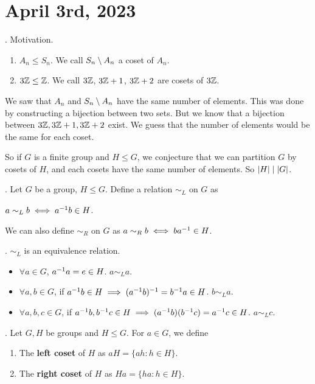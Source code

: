 \section*{April 3rd, 2023}


\ex. Motivation.
\begin{enumerate}
    \item \(A_n \leq S_n\). We call \(S_n \setminus A_n\) a coset of \(A_n\).
    \item \(3\mathbb{Z} \leq \mathbb{Z}\). We call \(3\mathbb{Z}\), \(3\mathbb{Z} + 1\), \(3\mathbb{Z} + 2\) are cosets of \(3\mathbb{Z}\).
\end{enumerate}

We saw that \(A_n\) and \(S_n \setminus A_n\) have the same number of elements. This was done by constructing a bijection between two sets. But we know that a bijection between \(3\mathbb{Z}, 3\mathbb{Z} + 1, 3\mathbb{Z} + 2\) exist. We guess that the number of elements would be the same for each coset.

So if \(G\) is a finite group and \(H \leq G\), we conjecture that we can partition \(G\) by cosets of \(H\), and each cosets have the same number of elements. So \(\left| H \right| \mid \left| G \right|\).

\bigskip

. Let \(G\) be a group, \(H \leq G\). Define a relation \(\sim_L\) on \(G\) as
\begin{center}
    \(a \sim_L b \iff a^{-1} b \in H\).
\end{center}

\rmk We can also define \(\sim_R\) on \(G\) as \(a \sim_R b \iff ba^{-1} \in H\).

\thm. \(\sim_L\) is an equivalence relation.

\pf
\begin{itemize}
    \item \(\forall a \in G\), \(a^{-1} a = e \in H\). \(a \sim_L a\).
    \item \(\forall a, b\in G\), if \(a^{-1} b \in H \implies (a^{-1} b)^{-1} = b^{-1} a \in H\). \(b \sim_L a\).
    \item\(\forall a, b, c\in G\), if \(a^{-1} b, b^{-1} c \in H \implies (a^{-1} b)(b^{-1} c) = a^{-1} c \in H\). \(a \sim_L c\).
\end{itemize}

.  Let \(G, H\) be groups and \(H \leq G\). For \(a \in G\), we define
\begin{enumerate}
    \item The \textbf{left coset} of \(H\) as \(aH = \{ah : h \in H\}\).
    \item The \textbf{right coset} of \(H\) as \(Ha = \{ha : h \in H\}\).
\end{enumerate}

